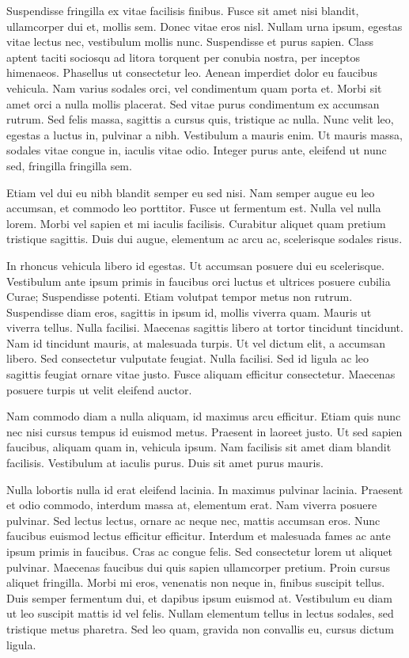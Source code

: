 Suspendisse fringilla ex vitae facilisis finibus. Fusce sit amet nisi blandit, ullamcorper dui et, mollis sem. Donec vitae eros nisl. Nullam urna ipsum, egestas vitae lectus nec, vestibulum mollis nunc. Suspendisse et purus sapien. Class aptent taciti sociosqu ad litora torquent per conubia nostra, per inceptos himenaeos. Phasellus ut consectetur leo. Aenean imperdiet dolor eu faucibus vehicula. Nam varius sodales orci, vel condimentum quam porta et. Morbi sit amet orci a nulla mollis placerat. Sed vitae purus condimentum ex accumsan rutrum. Sed felis massa, sagittis a cursus quis, tristique ac nulla. Nunc velit leo, egestas a luctus in, pulvinar a nibh. Vestibulum a mauris enim. Ut mauris massa, sodales vitae congue in, iaculis vitae odio. Integer purus ante, eleifend ut nunc sed, fringilla fringilla sem.

Etiam vel dui eu nibh blandit semper eu sed nisi. Nam semper augue eu leo accumsan, et commodo leo porttitor. Fusce ut fermentum est. Nulla vel nulla lorem. Morbi vel sapien et mi iaculis facilisis. Curabitur aliquet quam pretium tristique sagittis. Duis dui augue, elementum ac arcu ac, scelerisque sodales risus.

In rhoncus vehicula libero id egestas. Ut accumsan posuere dui eu scelerisque. Vestibulum ante ipsum primis in faucibus orci luctus et ultrices posuere cubilia Curae; Suspendisse potenti. Etiam volutpat tempor metus non rutrum. Suspendisse diam eros, sagittis in ipsum id, mollis viverra quam. Mauris ut viverra tellus. Nulla facilisi. Maecenas sagittis libero at tortor tincidunt tincidunt. Nam id tincidunt mauris, at malesuada turpis. Ut vel dictum elit, a accumsan libero. Sed consectetur vulputate feugiat. Nulla facilisi. Sed id ligula ac leo sagittis feugiat ornare vitae justo. Fusce aliquam efficitur consectetur. Maecenas posuere turpis ut velit eleifend auctor.

Nam commodo diam a nulla aliquam, id maximus arcu efficitur. Etiam quis nunc nec nisi cursus tempus id euismod metus. Praesent in laoreet justo. Ut sed sapien faucibus, aliquam quam in, vehicula ipsum. Nam facilisis sit amet diam blandit facilisis. Vestibulum at iaculis purus. Duis sit amet purus mauris.

Nulla lobortis nulla id erat eleifend lacinia. In maximus pulvinar lacinia. Praesent et odio commodo, interdum massa at, elementum erat. Nam viverra posuere pulvinar. Sed lectus lectus, ornare ac neque nec, mattis accumsan eros. Nunc faucibus euismod lectus efficitur efficitur. Interdum et malesuada fames ac ante ipsum primis in faucibus. Cras ac congue felis. Sed consectetur lorem ut aliquet pulvinar. Maecenas faucibus dui quis sapien ullamcorper pretium. Proin cursus aliquet fringilla. Morbi mi eros, venenatis non neque in, finibus suscipit tellus. Duis semper fermentum dui, et dapibus ipsum euismod at. Vestibulum eu diam ut leo suscipit mattis id vel felis. Nullam elementum tellus in lectus sodales, sed tristique metus pharetra. Sed leo quam, gravida non convallis eu, cursus dictum ligula.

